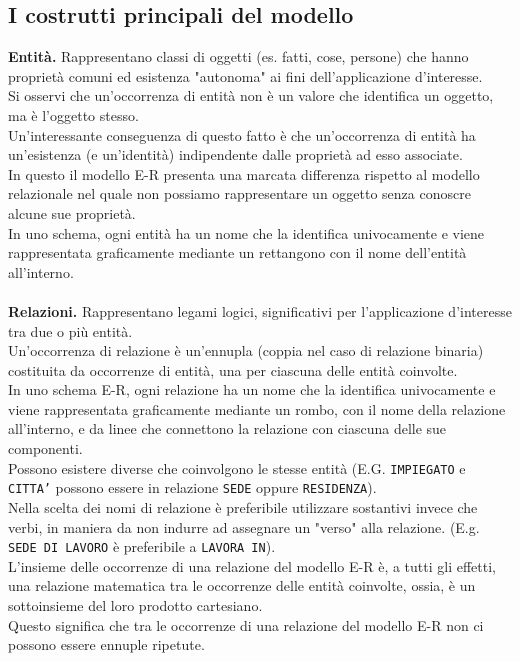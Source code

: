 \subsection{I costrutti principali del modello}
\textbf{Entità.} Rappresentano classi di oggetti (es. fatti, cose, persone) che hanno proprietà comuni ed esistenza "autonoma" ai fini dell'applicazione d'interesse.\\
Si osservi che un'occorrenza di entità non è un valore che identifica un oggetto, ma è l'oggetto stesso.\\
Un'interessante conseguenza di questo fatto è che un'occorrenza di entità ha un'esistenza (e un'identità) indipendente dalle proprietà ad esso associate.\\
In questo il modello E-R presenta una marcata differenza rispetto al modello relazionale nel quale non possiamo rappresentare un oggetto senza conoscre alcune sue proprietà.\\
In uno schema, ogni entità ha un nome che la identifica univocamente e viene rappresentata graficamente mediante un rettangono con il nome dell'entità all'interno.\\\\
\textbf{Relazioni.} Rappresentano legami logici, significativi per l'applicazione d'interesse tra due o più entità.\\
Un'occorrenza di relazione è un'ennupla (coppia nel caso di relazione binaria) costituita da occorrenze di entità, una per ciascuna delle entità coinvolte.\\
In uno schema E-R, ogni relazione ha un nome che la identifica univocamente e viene rappresentata graficamente mediante un rombo, con il nome della relazione all'interno, e da linee che connettono la relazione con ciascuna delle sue componenti.\\
Possono esistere diverse che coinvolgono le stesse entità (E.G. \texttt{IMPIEGATO} e \texttt{CITTA'} possono essere in relazione \texttt{SEDE} oppure \texttt{RESIDENZA}).\\
Nella scelta dei nomi di relazione è preferibile utilizzare sostantivi invece che verbi, in maniera da non indurre ad assegnare un "verso" alla relazione. (E.g. \texttt{SEDE DI LAVORO} è preferibile a \texttt{LAVORA IN}).\\
L'insieme delle occorrenze di una relazione del modello E-R è, a tutti gli effetti, una relazione matematica tra le occorrenze delle entità coinvolte, ossia, è un sottoinsieme del loro prodotto cartesiano.\\
Questo significa che tra le occorrenze di una relazione del modello E-R non ci possono essere ennuple ripetute.\\

